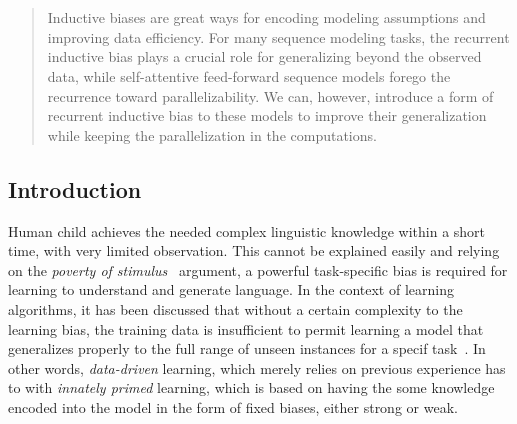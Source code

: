 \chapter{}

\label{chap:6}
%
\begin{quote}
Inductive biases are great ways for encoding modeling assumptions and improving data efficiency. For many sequence modeling tasks, the recurrent inductive bias plays a crucial role for generalizing beyond the observed data, while self-attentive feed-forward sequence models forego the recurrence toward parallelizability. We can, however, introduce a form of recurrent inductive bias to these models to improve their generalization while keeping the parallelization in the computations. 
\end{quote}
%

\section{Introduction}
Human child achieves the needed complex linguistic knowledge within a short time, with very limited observation. This cannot be explained easily and relying on the \emph{poverty of stimulus}~\citep{chomsky1980rules} argument, a powerful task-specific bias is required for learning to understand and generate language. In the context of learning algorithms, it has been discussed that without a certain complexity to the learning bias, the training data is insufficient to permit learning a model that generalizes properly to the full range of unseen instances for a specif task~\cite{Mitchell80theneed}. In other words, \emph{data-driven} learning, which merely relies on previous experience has to  with \emph{innately primed} learning, which is based on having the some knowledge encoded into the model in the form of fixed biases, either strong or weak.

